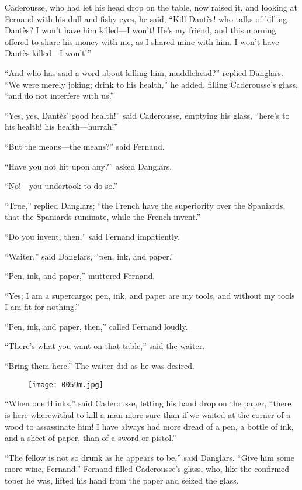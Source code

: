 Caderousse, who had let his head drop on the table, now raised it, and
looking at Fernand with his dull and fishy eyes, he said, “Kill Dantès!
who talks of killing Dantès? I won’t have him killed—I won’t! He’s my
friend, and this morning offered to share his money with me, as I
shared mine with him. I won’t have Dantès killed—I won’t!”

“And who has said a word about killing him, muddlehead?” replied
Danglars. “We were merely joking; drink to his health,” he added,
filling Caderousse’s glass, “and do not interfere with us.”

“Yes, yes, Dantès’ good health!” said Caderousse, emptying his glass,
“here’s to his health! his health—hurrah!”

“But the means—the means?” said Fernand.

“Have you not hit upon any?” asked Danglars.

“No!—you undertook to do so.”

“True,” replied Danglars; “the French have the superiority over the
Spaniards, that the Spaniards ruminate, while the French invent.”

“Do you invent, then,” said Fernand impatiently.

“Waiter,” said Danglars, “pen, ink, and paper.”

“Pen, ink, and paper,” muttered Fernand.

“Yes; I am a supercargo; pen, ink, and paper are my tools, and without
my tools I am fit for nothing.”

“Pen, ink, and paper, then,” called Fernand loudly.

“There’s what you want on that table,” said the waiter.

“Bring them here.” The waiter did as he was desired.

\begin{figure}[h]
\texttt{[image: 0059m.jpg]}
\end{figure}

“When one thinks,” said Caderousse, letting his hand drop on the paper,
“there is here wherewithal to kill a man more sure than if we waited at
the corner of a wood to assassinate him! I have always had more dread
of a pen, a bottle of ink, and a sheet of paper, than of a sword or
pistol.”

“The fellow is not so drunk as he appears to be,” said Danglars. “Give
him some more wine, Fernand.” Fernand filled Caderousse’s glass, who,
like the confirmed toper he was, lifted his hand from the paper and
seized the glass.

